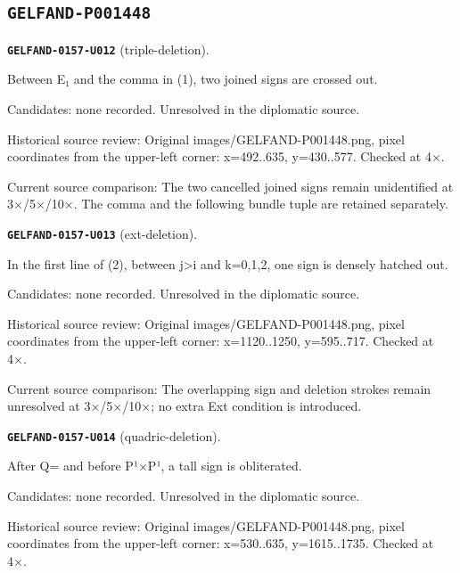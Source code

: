 \subsection*{\texttt{GELFAND-P001448}}
\par\noindent\leavevmode{}\label{GELFAND-0157-U012}\label{GELFAND-P001448:triple-deletion}\textbf{\texttt{GELFAND-0157-U012}} (triple-deletion).\nopagebreak[4]\par
Between E₁ and the comma in (1), two joined signs are crossed out.\par
Candidates: none recorded. Unresolved in the diplomatic source.\par
Historical source review: Original images/GELFAND-P001448.png, pixel coordinates from the upper-left corner: x=492..635, y=430..577. Checked at 4×.\par
Current source comparison: The two cancelled joined signs remain unidentified at 3×/5×/10×. The comma and the following bundle tuple are retained separately.\par\medskip
\par\noindent\leavevmode{}\label{GELFAND-0157-U013}\label{GELFAND-P001448:ext-deletion}\textbf{\texttt{GELFAND-0157-U013}} (ext-deletion).\nopagebreak[4]\par
In the first line of (2), between j>i and k=0,1,2, one sign is densely hatched out.\par
Candidates: none recorded. Unresolved in the diplomatic source.\par
Historical source review: Original images/GELFAND-P001448.png, pixel coordinates from the upper-left corner: x=1120..1250, y=595..717. Checked at 4×.\par
Current source comparison: The overlapping sign and deletion strokes remain unresolved at 3×/5×/10×; no extra Ext condition is introduced.\par\medskip
\par\noindent\leavevmode{}\label{GELFAND-0157-U014}\label{GELFAND-P001448:quadric-deletion}\textbf{\texttt{GELFAND-0157-U014}} (quadric-deletion).\nopagebreak[4]\par
After Q= and before P¹×P¹, a tall sign is obliterated.\par
Candidates: none recorded. Unresolved in the diplomatic source.\par
Historical source review: Original images/GELFAND-P001448.png, pixel coordinates from the upper-left corner: x=530..635, y=1615..1735. Checked at 4×.\par

